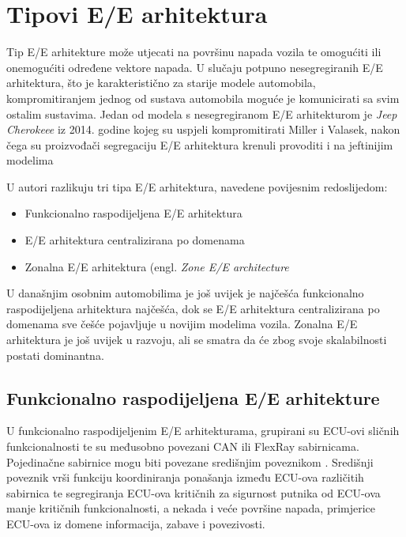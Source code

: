 \documentclass[times, utf8, diplomski, numeric]{fer}
\begin{document}
\section{Tipovi E/E arhitektura}
Tip E/E arhitekture može utjecati na površinu napada vozila te omogućiti ili onemogućiti određene vektore napada. U slučaju potpuno nesegregiranih E/E arhitektura, što je karakteristično za starije modele automobila, kompromitiranjem jednog od sustava automobila moguće je komunicirati sa svim ostalim sustavima. Jedan od modela s nesegregiranom E/E arhitekturom je \textit{Jeep Cherokeee} iz 2014. godine kojeg su uspjeli kompromitirati Miller i Valasek, nakon čega su proizvođači segregaciju E/E arhitektura krenuli provoditi i na jeftinijim modelima \cite{miller2015remote, dissecto2023networks}

U \cite{bosch2022handbook} autori razlikuju tri tipa E/E arhitektura, navedene povijesnim redoslijedom:
\begin{itemize}
    \item Funkcionalno raspodijeljena E/E arhitektura 
    \item E/E arhitektura centralizirana po domenama 
    \item Zonalna E/E arhitektura (engl. \textit{Zone E/E architecture} 
\end{itemize}

U današnjim osobnim automobilima je još uvijek je najčešća funkcionalno raspodijeljena arhitektura najčešća, dok se E/E arhitektura centralizirana po domenama sve češće pojavljuje u novijim modelima vozila. Zonalna E/E arhitektura je još uvijek u razvoju, ali se smatra da će zbog svoje skalabilnosti postati dominantna\cite{bosch2022handbook, nasser2023automotive, dissecto2023networks}.

\subsection{Funkcionalno raspodijeljena E/E arhitekture}
U funkcionalno raspodijeljenim E/E arhitekturama, grupirani su ECU-ovi sličnih funkcionalnosti te su međusobno povezani CAN ili FlexRay sabirnicama. Pojedinačne sabirnice mogu biti povezane središnjim poveznikom . Središnji poveznik vrši funkciju koordiniranja ponašanja između ECU-ova različitih sabirnica te segregiranja ECU-ova kritičnih za sigurnost putnika od ECU-ova manje kritičnih funkcionalnosti, a nekada i veće površine napada, primjerice ECU-ova iz domene informacija, zabave i povezivosti.
\end{document}
